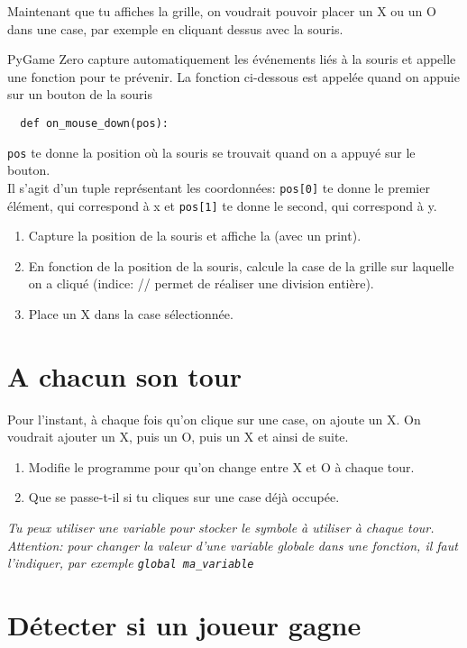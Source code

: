 \documentclass[11pt]{article}
\begin{document}
Maintenant que tu affiches la grille, on voudrait pouvoir placer un X ou un O dans une case, par exemple en cliquant dessus avec la souris.

PyGame Zero capture automatiquement les événements liés à la souris et appelle une fonction pour te prévenir.
La fonction ci-dessous est appelée quand on appuie sur un bouton de la souris
\begin{lstlisting}
  def on_mouse_down(pos):
\end{lstlisting}
\lstinline{pos} te donne la position où la souris se trouvait quand on a appuyé sur le bouton.\\
Il s'agit d'un tuple représentant les coordonnées: \lstinline{pos[0]} te donne le premier élément, qui correspond à x et \lstinline{pos[1]} te donne le second, qui correspond à y.

\begin{enumerate}
    \item Capture la position de la souris et affiche la (avec un print).
    \item En fonction de la position de la souris, calcule la case de la grille sur laquelle on a cliqué (indice: // permet de réaliser une division entière).
    \item Place un X dans la case sélectionnée.
\end{enumerate}

\section{A chacun son tour}

Pour l'instant, à chaque fois qu'on clique sur une case, on ajoute un X. On voudrait ajouter un X, puis un O, puis un X et ainsi de suite.

\begin{enumerate}
    \item Modifie le programme pour qu'on change entre X et O à chaque tour.
    \item Que se passe-t-il si tu cliques sur une case déjà occupée.
\end{enumerate}

\textit{
Tu peux utiliser une variable pour stocker le symbole à utiliser à chaque tour.\\
Attention: pour changer la valeur d'une variable globale dans une fonction, il faut l'indiquer, par exemple \lstinline{global ma_variable}
}

\section{Détecter si un joueur gagne}
\end{document}
